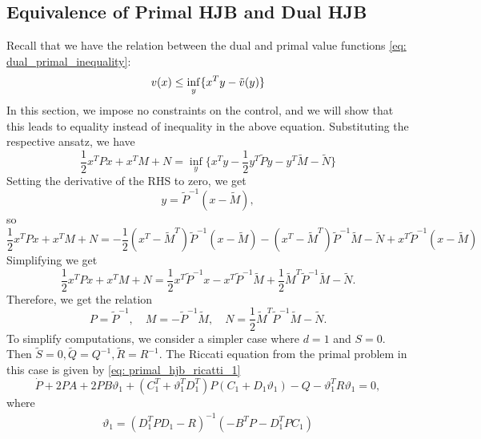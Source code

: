 \newpage 
\subsection{Equivalence of Primal HJB and Dual HJB}
Recall that we have the relation between the dual and primal value functions \eqref{eq: dual_primal_inequality}:
\begin{equation*}
    v(x) \le \inf_y \{x^T y - \Tilde{v}(y)  \}
\end{equation*}
In this section, we impose no constraints on the control, and we will show that this leads to equality instead of inequality in the above equation. Substituting the respective ansatz, we have
\begin{equation*}
    \frac12 x^T P x + x^T M + N = \inf_y \bigg\{ x^T y - \frac12 y^T \tilde{P} y - y^T \tilde{M} - \tilde{N}  \bigg\}
\end{equation*}
Setting the derivative of the RHS to zero, we get 
\begin{equation*}
    y = \tilde{P}^{-1}(x - \tilde{M}),
\end{equation*}
so
\begin{equation*}
    \frac12 x^T P x + x^T M + N  = - \frac12 (x^T - \tilde{M}^T)\tilde{P}^{-1} (x-\tilde{M}) - (x^T - \tilde{M}^T)\tilde{P}^{-1} \tilde{M} - \tilde{N} + x^T \tilde{P}^{-1}(x - \tilde{M})
\end{equation*}
Simplifying we get
\begin{equation*}
    \frac12 x^T P x + x^T M + N = \frac12 x^T \tilde{P}^{-1}x - x^T \tilde{P}^{-1}\tilde{M} + \frac12 \tilde{M}^T \tilde{P}^{-1} \tilde{M} - \tilde{N}.
\end{equation*}
Therefore, we get the relation
\begin{equation*}
    P = \tilde{P}^{-1}, \quad M = -\tilde{P}^{-1} \tilde{M}, \quad N =  \frac12 \tilde{M}^T \tilde{P}^{-1} \tilde{M} - \tilde{N}.
\end{equation*}
To simplify computations, we consider a simpler case where $d=1$ and $S = 0$. Then $\tilde{S}=0, \tilde{Q}= Q^{-1}, \tilde{R} = R^{-1}$.
The Riccati equation from the primal problem in this case is given by \eqref{eq: primal_hjb_ricatti_1}
\begin{equation*}
     \dot{P}  +  2P A + 2P B \vartheta_1 + (C_1^T + \vartheta_1^T D_1^T)P(C_1 + D_1 \vartheta_1) 
     -  Q -  \vartheta_1^T R \vartheta_1 = 0,
\end{equation*}
where 
\begin{align*}
    \vartheta_1 = ( D_1^T  P D_1 - R)^{-1} ( - B^T  P - D_1^T  P C_1 )
\end{align*}
